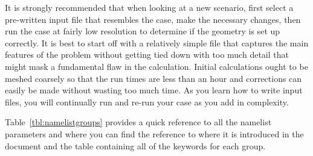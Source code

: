 \documentclass[11pt]{book}
\begin{document}
\noindent
It is strongly recommended that when looking at a new scenario,
first select a pre-written input file that resembles the case,
make the necessary changes, then run the case at fairly low
resolution to determine if the geometry is set up correctly.
It is best to start off with a relatively simple file that captures the main
features of the problem without getting tied down with too much detail that
might mask a fundamental flaw in the calculation. Initial calculations ought
to be meshed coarsely so that the run times are less than an hour and
corrections can easily be made without wasting too much time.
As you learn how to write input files, you will continually
run and re-run your case as you add in complexity.

Table~\ref{tbl:namelistgroups} provides a quick reference to all the namelist parameters and
where you can find the reference to where it is introduced in the document and the
table containing all of the keywords for each group. 
\end{document}
